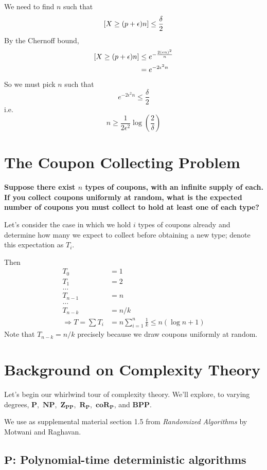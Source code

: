 \documentclass[11pt]{article}
\let\Pr\relax
\DeclareMathOperator*{\Pr}{\mathbb{P}}
\newcommand{\eps}{\epsilon}
\newcommand{\Pt}{\ensuremath{\mathbf{P}}}
\newcommand{\NP}{\ensuremath{\mathbf{NP}}}
\newcommand{\BPP}{\ensuremath{\mathbf{BPP}}}
\newcommand{\ZPP}{\ensuremath{\mathbf{Z_{PP}}}}
\newcommand{\RP}{\ensuremath{\mathbf{R_{P}}}}
\newcommand{\coRP}{\ensuremath{\mathbf{coR_{P}}}}
\let\ab\allowbreak
\begin{document}
We need to find $n$ such that
$$ \Pr[X \ge (p + \eps)n] \le \frac{\delta}{2} $$
By the Chernoff bound,
\begin{align*}
  \Pr[X \ge (p + \eps)n] &\le e^{-\frac{2(\eps n)^2}{n}} \\
                         &= e^{-2\eps^2 n}
\end{align*}
So we must pick $n$ such that
$$ e^{-2\eps^2 n} \le \frac \delta 2 $$
i.e.
$$ n \ge \frac{1}{2\eps^2}\log\left(\frac{2}{\delta} \right) $$

\section{The Coupon Collecting Problem}

\textbf{Suppose there exist $n$ types of coupons, with an infinite supply of each. If you collect coupons uniformly at random, what is the expected number of coupons you must collect to hold at least one of each type?}

Let's consider the case in which we hold $i$ types of coupons already and determine how many we expect to collect before obtaining a new type; denote this expectation as $T_i$.

Then
\begin{align*}
  T_0 &= 1 \\
  T_1 &= 2 \\
  \ldots \\
  T_{n-1} &= n \\
  \ldots \\
  T_{n-k} &= n / k \\
  \Rightarrow T = \sum{T_i} &= n \sum_{i=1}^n \frac{1}{k} \leq n(\log n + 1)
\end{align*}
Note that $T_{n-k} = n / k$ precisely because we draw coupons uniformly at random.

\section{Background on Complexity Theory}

Let's begin our whirlwind tour of complexity theory. We'll explore, to varying degrees, \Pt,\ \NP,\ab\ \ZPP,\ \RP,\ \coRP, and \BPP.

We use as supplemental material section 1.5 from \textit{Randomized Algorithms} by Motwani and Raghavan.

\subsection{\Pt: Polynomial-time deterministic algorithms}
\end{document}
